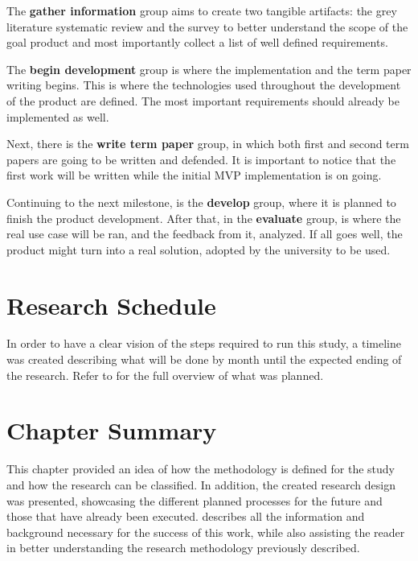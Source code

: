 The \textbf{gather information} group aims to create two tangible artifacts: the grey literature systematic review and the survey to better understand the scope of the goal product and most importantly collect a list of well defined requirements.

The \textbf{begin development} group is where the implementation and the term paper writing begins. This is where the technologies used throughout the development of the product are defined. The most important requirements should already be implemented as well.

Next, there is the \textbf{write term paper} group, in which both first and second term papers are going to be written and defended. It is important to notice that the first work will be written while the initial \ac{MVP} implementation is on going.

Continuing to the next milestone, is the \textbf{develop} group, where it is planned to finish the product development. After that, in the \textbf{evaluate} group, is where the real use case will be ran, and the feedback from it, analyzed. If all goes well, the product might turn into a real solution, adopted by the university to be used.

\section{Research Schedule}\label{sec:met-schedule}

In order to have a clear vision of the steps required to run this study, a timeline was created describing what will be done by month until the expected ending of the research. Refer to  for the full overview of what was planned.



\section{Chapter Summary}\label{sec:met-4}

This chapter provided an idea of how the methodology is defined for the study and how the research can be classified. In addition, the created research design was presented, showcasing the different planned processes for the future and those that have already been executed.  describes all the information and background necessary for the success of this work, while also assisting the reader in better understanding the research methodology previously described.